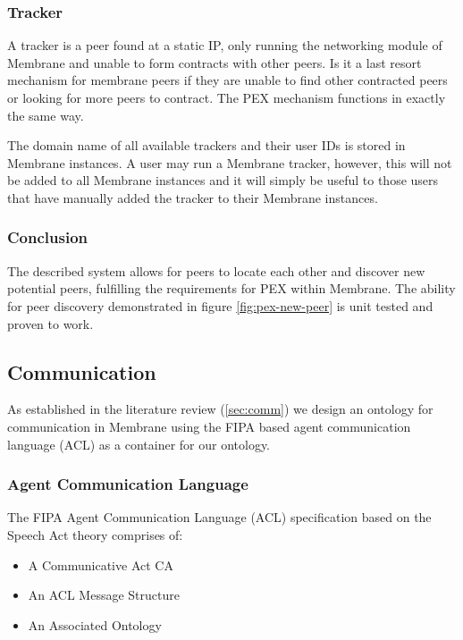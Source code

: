 \documentclass[11pt, a4paper, twoside]{report}
\begin{document}
\subsubsection{Tracker}

A tracker is a peer found at a static IP, only running the networking module of Membrane and unable to form contracts with other peers. Is it a last resort mechanism for membrane peers if they are unable to find other contracted peers or looking for more peers to contract. The PEX mechanism functions in exactly the same way.

The domain name of all available trackers and their user IDs is stored in Membrane instances. A user may run a Membrane tracker, however, this will not be added to all Membrane instances and it will simply be useful to those users that have manually added the tracker to their Membrane instances.

\subsubsection{Conclusion}

The described system allows for peers to locate each other and discover new potential peers, fulfilling the requirements for PEX within Membrane. The ability for peer discovery demonstrated in figure \ref{fig:pex-new-peer} is unit tested and proven to work.

\subsection{Communication}

As established in the literature review (\ref{sec:comm}) we design an ontology for communication in Membrane using the FIPA based agent communication language (ACL) as a container for our ontology.

\subsubsection{Agent Communication Language}

The FIPA Agent Communication Language (ACL) specification based on the Speech Act theory \citep{labrou1999agent} comprises of:

\begin{itemize}
 \item A Communicative Act CA
 \item An ACL Message Structure
 \item An Associated Ontology
\end{itemize}
\end{document}
